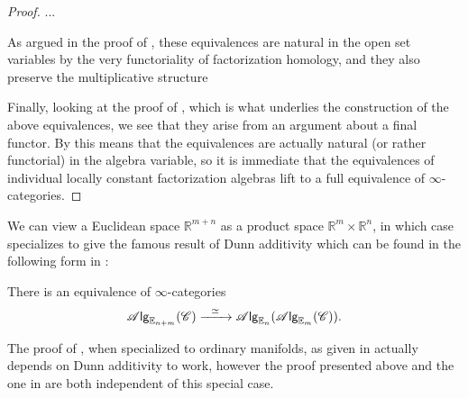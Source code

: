 \documentclass[../text.tex]{subfiles}
\begin{document}
\begin{proof}
    ...
    
    
    As argued in the proof of , these equivalences are natural in the open set variables by the very functoriality of factorization homology, and they also preserve the multiplicative structure %
    
    Finally, looking at the proof of \cite[thm.2.25]{aft_fhstrat}, which is what underlies the construction of the above equivalences, we see that they arise from an argument about a final functor. By  this means that the equivalences are actually natural (or rather functorial) in the algebra variable, so it is immediate that the equivalences of individual locally constant factorization algebras lift to a full equivalence of $\infty$-categories.
\end{proof}


\begin{example}
    We can view a Euclidean space $\mathbb{R}^{m+n}$ as a product space $\mathbb{R}^m \times \mathbb{R}^n$, in which case  specializes to give the famous result of Dunn additivity \cite{dunn1988} which can be found in the following form in \cite{lurie_ha}:

    \begin{proposition}\label{prop:dunn_additivity}
        There is an equivalence of $\infty$-categories
        \begin{equation}
            \mathscr{A} \mathsf{lg}_{\mathbb{E}_{n + m}} (\mathscr{C}) \xrightarrow{\ \ \simeq \ \ } \mathscr{A} \mathsf{lg}_{\mathbb{E}_n} (\mathscr{A} \mathsf{lg}_{\mathbb{E}_m} (\mathscr{C})).
        \end{equation}
    \end{proposition}
\end{example}


\begin{remark}
    The proof of , when specialized to ordinary manifolds, as given in \cite{ginot2015} actually depends on Dunn additivity to work, however the proof presented above and the one in \cite{lurie_ha} are both independent of this special case. 
\end{remark}
\end{document}
